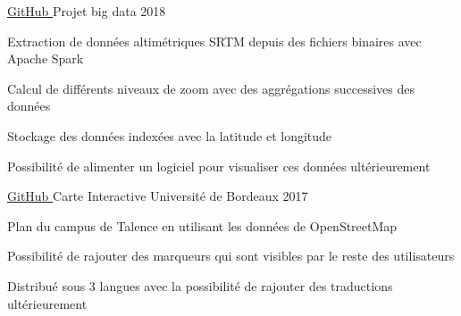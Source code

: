 \newpage
{}

\begin{cventries}
    \cventry
    {\href{https://github.com/velezsarain/projetPLE}{GitHub \space \faExternalLink}}
    {Projet big data}
    {}
    {2018}
    {
      \begin{cvitems}
        \item {Extraction de données altimétriques SRTM depuis des fichiers binaires avec Apache Spark}
        \item {Calcul de différents niveaux de zoom avec des aggrégations successives des données}
        \item {Stockage des données indexées avec la latitude et longitude}
        \item {Possibilité de alimenter un logiciel pour visualiser ces données ultérieurement}
      \end{cvitems}
    }
    
    \cventry
    {\href{https://github.com/velezsarain/carteInteractiveUB}{GitHub \space \faExternalLink}}
    {Carte Interactive Université de Bordeaux}
    {}
    {2017}
    {
      \begin{cvitems}
        \item {Plan du campus de Talence en utilisant les données de OpenStreetMap}
        \item {Possibilité de rajouter des marqueurs qui sont visibles par le reste des utilisateurs}
        \item {Distribué sous 3 langues avec la possibilité de rajouter des traductions ultérieurement}
      \end{cvitems}
    }
\end{cventries}